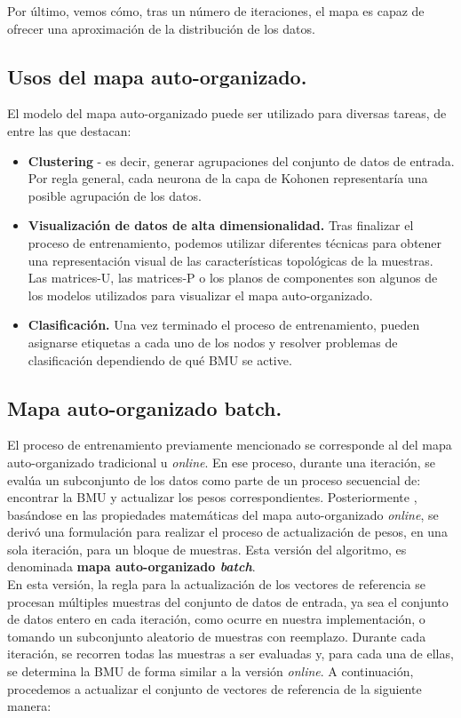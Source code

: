 Por último, vemos cómo, tras un número de iteraciones, el mapa es capaz de ofrecer una aproximación de la distribución de los datos.
\subsection{Usos del mapa auto-organizado.}
El modelo del mapa auto-organizado puede ser utilizado para diversas tareas, de entre las que destacan:\\

\begin{itemize}
	\item \textbf{Clustering} - es decir, generar agrupaciones del conjunto de datos de entrada. Por regla general, cada neurona de la capa de Kohonen representaría una posible agrupación de los datos. 

	\item \textbf{Visualización de datos de alta dimensionalidad.} Tras finalizar el proceso de entrenamiento, podemos utilizar diferentes técnicas para obtener una representación visual de las características topológicas de la muestras. Las matrices-U, las matrices-P o los planos de componentes son algunos de los modelos utilizados para visualizar el mapa auto-organizado.

	\item \textbf{Clasificación.} Una vez terminado el proceso de entrenamiento, pueden asignarse etiquetas a cada uno de los nodos y resolver problemas de clasificación dependiendo de qué BMU se active. 
	\end{itemize}

\subsection{Mapa auto-organizado batch.}
El proceso de entrenamiento previamente mencionado se corresponde al del mapa auto-organizado tradicional u \textit{online}. En ese proceso, durante una iteración, se evalúa un subconjunto de los datos como parte de un proceso secuencial de: encontrar la BMU y actualizar los pesos correspondientes. Posteriormente \cite{kohonenbatch}, basándose en las propiedades matemáticas del mapa auto-organizado \textit{online}, se derivó una formulación para realizar el proceso de actualización de pesos, en una sola iteración, para un bloque de muestras. Esta versión del algoritmo, es denominada \textbf{mapa auto-organizado \textit{batch}}. \\

En esta versión, la regla para la actualización de los vectores de referencia se procesan múltiples muestras del conjunto de datos de entrada, ya sea el conjunto de datos entero en cada iteración, como ocurre en nuestra implementación, o tomando un subconjunto aleatorio de muestras con reemplazo. Durante cada iteración, se recorren todas las muestras a ser evaluadas y, para cada una de ellas, se determina la BMU de forma similar a la versión \textit{online}. A continuación, procedemos a actualizar el conjunto de vectores de referencia de la siguiente manera:\\

